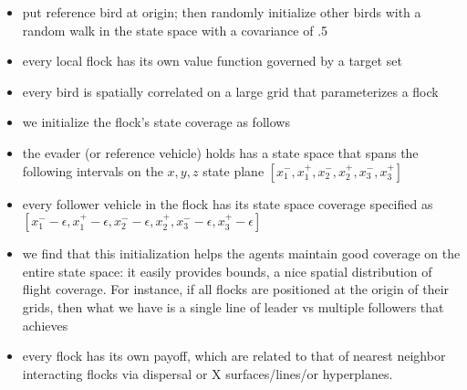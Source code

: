 \begin{itemize}
	\item put reference bird at origin; then randomly initialize other birds with a random walk in the state space with a covariance of .5~\cite{LekanCASE2016Paper}
	\item every local flock has its own value function governed by a target set
	\item every bird is spatially correlated on a large grid that parameterizes a flock
	\item we initialize the flock's state coverage as follows
	\item the evader (or reference vehicle) holds has a state space that spans the following intervals on the $x,y,z$ state plane
	$[x_1^-, x_1^+, x_2^-, x_2^+, x_3^-, x_3^+]$
	\item every follower vehicle in the flock has its state space coverage specified as
	$[x_1^- -\epsilon, x_1^+ - \epsilon, x_2^- -\epsilon, x_2^+, x_3^- -\epsilon, x_3^+ - \epsilon]$
	\item we find that this initialization helps the agents maintain good coverage on the entire state space: it easily provides bounds, a nice spatial distribution of flight coverage. For instance, if all flocks are positioned at the origin of their grids, then what we have is a single line of leader vs multiple followers that achieves
	\item every flock has its own payoff, which are related to that of nearest neighbor interacting flocks via dispersal or X surfaces/lines/or hyperplanes.
\end{itemize}


